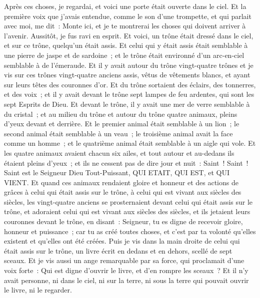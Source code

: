 \begin{multicols}{2}
\VerseOne{}Après ces choses, je regardai, et voici une porte était ouverte dans le ciel. Et la première voix que j'avais entendue, comme le son d'une trompette, et qui parlait avec moi, me dit~: Monte ici, et je te montrerai les choses qui doivent arriver à l'avenir.
Aussitôt, je fus ravi en esprit. Et voici, un trône était dressé dans le ciel, et sur ce trône, quelqu'un était assis.
Et celui qui y était assis était semblable à une pierre de jaspe et de sardoine~; et le trône était environné d'un arc-en-ciel semblable à de l'émeraude.
Et il y avait autour du trône vingt-quatre trônes et je vis sur ces trônes vingt-quatre anciens assis, vêtus de vêtements blancs, et ayant sur leurs têtes des couronnes d'or.
Et du trône sortaient des éclairs, des tonnerres, et des voix~; et il y avait devant le trône sept lampes de feu ardentes, qui sont les sept Esprits de Dieu.
Et devant le trône, il y avait une mer de verre semblable à du cristal~; et au milieu du trône et autour du trône quatre animaux, pleins d'yeux devant et derrière.
Et le premier animal était semblable à un lion~; le second animal était semblable à un veau~; le troisième animal avait la face comme un homme~; et le quatrième animal était semblable à un aigle qui vole.
Et les quatre animaux avaient chacun six ailes, et tout autour et au-dedans ils étaient pleins d'yeux~; et ils ne cessent pas de dire jour et nuit~: Saint~! Saint~! Saint est le Seigneur Dieu Tout-Puissant, QUI ETAIT, QUI EST, et QUI VIENT.
Et quand ces animaux rendaient gloire et honneur et des actions de grâces à celui qui était assis sur le trône, à celui qui est vivant aux siècles des siècles,
les vingt-quatre anciens se prosternaient devant celui qui était assis sur le trône, et adoraient celui qui est vivant aux siècles des siècles, et ils jetaient leurs couronnes devant le trône, en disant~:
Seigneur, tu es digne de recevoir gloire, honneur et puissance~; car tu as créé toutes choses, et c'est par ta volonté qu'elles existent et qu'elles ont été créées.
\VerseOne{}Puis je vis dans la main droite de celui qui était assis sur le trône, un livre écrit en dedans et en dehors, scellé de sept sceaux.
Et je vis aussi un ange remarquable par sa force, qui proclamait d'une voix forte~: Qui est digne d'ouvrir le livre, et d'en rompre les sceaux~?
Et il n'y avait personne, ni dans le ciel, ni sur la terre, ni sous la terre qui pouvait ouvrir le livre, ni le regarder.

\end{multicols}
